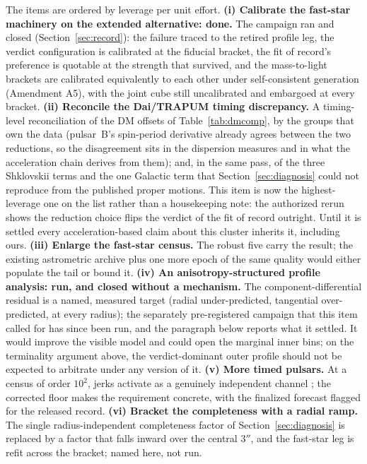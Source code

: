 \documentclass[11pt]{article}
\begin{document}
The items are ordered by leverage per unit effort. \textbf{(i) Calibrate the fast-star machinery on the extended alternative: done.} The campaign ran and closed (Section~\ref{sec:record}): the failure traced to the retired profile leg, the verdict configuration is calibrated at the fiducial bracket, the fit of record's preference is quotable at the strength that survived, and the mass-to-light brackets are calibrated equivalently to each other under self-consistent generation (Amendment A5), with the joint cube still uncalibrated and embargoed at every bracket. \textbf{(ii) Reconcile the Dai/TRAPUM timing discrepancy.} A timing-level reconciliation of the DM offsets of Table~\ref{tab:dmcomp}, by the groups that own the data (pulsar~B's spin-period derivative already agrees between the two reductions, so the disagreement sits in the dispersion measures and in what the acceleration chain derives from them); and, in the same pass, of the three Shklovskii terms and the one Galactic term that Section~\ref{sec:diagnosis} could not reproduce from the published proper motions. This item is now the highest-leverage one on the list rather than a housekeeping note: the authorized rerun shows the reduction choice flips the verdict of the fit of record outright. Until it is settled every acceleration-based claim about this cluster inherits it, including ours. \textbf{(iii) Enlarge the fast-star census.} The robust five carry the result; the existing astrometric archive plus one more epoch of the same quality would either populate the tail or bound it. \textbf{(iv) An anisotropy-structured profile analysis: run, and closed without a mechanism.} The component-differential residual is a named, measured target (radial under-predicted, tangential over-predicted, at every radius); the separately pre-registered campaign that this item called for has since been run, and the paragraph below reports what it settled. It would improve the visible model and could open the marginal inner bins; on the terminality argument above, the verdict-dominant outer profile should not be expected to arbitrate under any version of it. \textbf{(v) More timed pulsars.} At a census of order $10^{2}$, jerks activate as a genuinely independent channel \citep{Abbate2019,ChenPTA2025}; the corrected floor makes the requirement concrete, with the finalized forecast flagged for the released record. \textbf{(vi) Bracket the completeness with a radial ramp.} The single radius-independent completeness factor of Section~\ref{sec:diagnosis} is replaced by a factor that falls inward over the central $3''$, and the fast-star leg is refit across the bracket; named here, not run.
\end{document}
